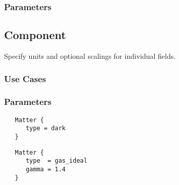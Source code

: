 \subsubsection{Parameters}

\subsection{ Component} \label{ss:component-matter}

 Specify units and optional scalings for individual
 fields.  

\subsubsection{Use Cases}

\subsubsection{Parameters}

\begin{verbatim}
   Matter {
      type = dark
   }
\end{verbatim}

\begin{verbatim}
   Matter {
      type  = gas_ideal
      gamma = 1.4
   }
\end{verbatim}
